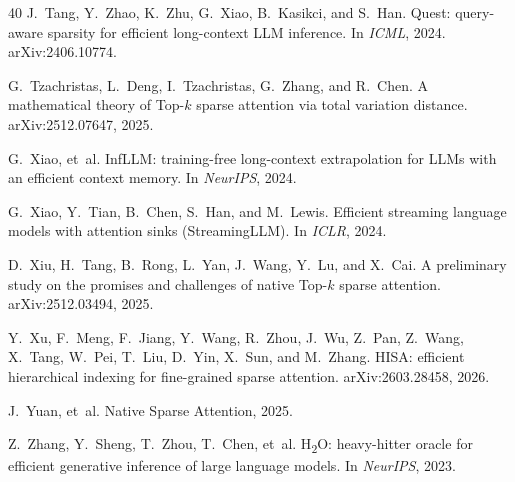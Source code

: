 \documentclass[11pt]{article}
\theoremstyle{definition}
\theoremstyle{remark}
\theoremstyle{plain}
\begin{document}
\begin{thebibliography}{40}
J.~Tang, Y.~Zhao, K.~Zhu, G.~Xiao, B.~Kasikci, and S.~Han.
\newblock Quest: query-aware sparsity for efficient long-context LLM inference.
\newblock In \emph{ICML}, 2024. arXiv:2406.10774.

G.~Tzachristas, L.~Deng, I.~Tzachristas, G.~Zhang, and R.~Chen.
\newblock A mathematical theory of Top-$k$ sparse attention via total variation distance.
\newblock arXiv:2512.07647, 2025.

G.~Xiao, et~al.
\newblock InfLLM: training-free long-context extrapolation for LLMs with an efficient context memory.
\newblock In \emph{NeurIPS}, 2024.

G.~Xiao, Y.~Tian, B.~Chen, S.~Han, and M.~Lewis.
\newblock Efficient streaming language models with attention sinks (StreamingLLM).
\newblock In \emph{ICLR}, 2024.

D.~Xiu, H.~Tang, B.~Rong, L.~Yan, J.~Wang, Y.~Lu, and X.~Cai.
\newblock A preliminary study on the promises and challenges of native Top-$k$ sparse attention.
\newblock arXiv:2512.03494, 2025.

Y.~Xu, F.~Meng, F.~Jiang, Y.~Wang, R.~Zhou, J.~Wu, Z.~Pan, Z.~Wang, X.~Tang,
W.~Pei, T.~Liu, D.~Yin, X.~Sun, and M.~Zhang.
\newblock HISA: efficient hierarchical indexing for fine-grained sparse attention.
\newblock arXiv:2603.28458, 2026.

J.~Yuan, et~al.
\newblock Native Sparse Attention, 2025.

Z.~Zhang, Y.~Sheng, T.~Zhou, T.~Chen, et~al.
\newblock H\textsubscript{2}O: heavy-hitter oracle for efficient generative inference of large language models.
\newblock In \emph{NeurIPS}, 2023.

\end{thebibliography}
\end{document}
